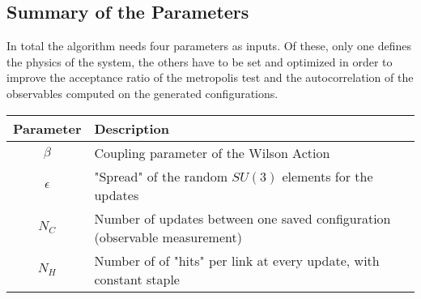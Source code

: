 \subsection{Summary of the Parameters}
In total the algorithm needs four parameters as inputs. Of these, only one defines the physics of the system, the others have to be set and optimized in order to improve the acceptance ratio of the metropolis test and the autocorrelation of the observables computed on the generated configurations.

\begin{table}[!htb]
\begin{center}
\begin{tabular}{cl}
    Parameter & Description\\\hline
    $\beta$ & Coupling parameter of the Wilson Action\\
    $\epsilon$ & "Spread" of the random $SU(3)$ elements for the updates\\
    $N_C$ & Number of updates between one saved configuration (observable measurement)\\
    $N_H$ & Number of of "hits" per link at every update, with constant staple 
\end{tabular}
\label{MC:params}
\end{center}
\end{table}

